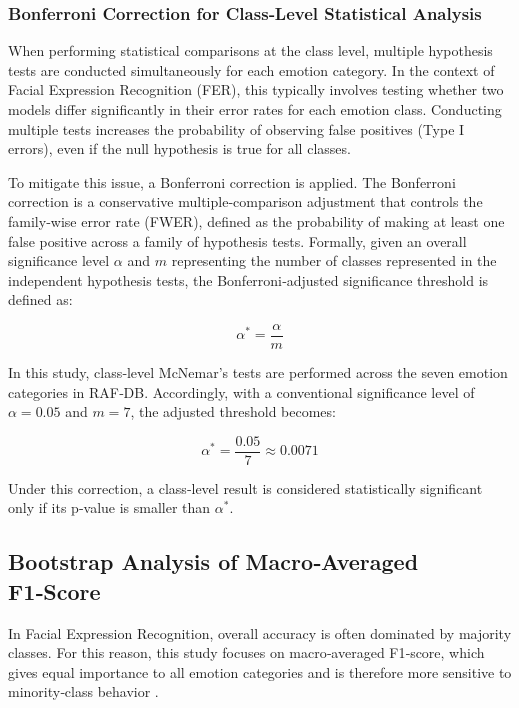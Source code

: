 \subsubsection{Bonferroni Correction for Class‑Level Statistical Analysis}\label{subsub:bonferroni_correction}

When performing statistical comparisons at the class level, multiple hypothesis tests are conducted simultaneously for each emotion category. In the context of Facial Expression Recognition (\gls{FER}), this typically involves testing whether two models differ significantly in their error rates for each emotion class. Conducting multiple tests increases the probability of observing false positives (Type I errors), even if the null hypothesis is true for all classes.

To mitigate this issue, a Bonferroni correction is applied. The Bonferroni correction is a conservative multiple‑comparison adjustment that controls the family‑wise error rate (FWER), defined as the probability of making at least one false positive across a family of hypothesis tests. Formally, given an overall significance level $\alpha$ and $m$ representing the number of classes represented in the independent hypothesis tests, the Bonferroni‑adjusted significance threshold is defined as:

$$\alpha^* = \frac{\alpha}{m}$$

In this study, class‑level McNemar’s tests are performed across the seven emotion categories in RAF‑DB. Accordingly, with a conventional significance level of $\alpha = 0.05 $ and $m=7$, the adjusted threshold becomes:

$$\alpha^* = \frac{0.05}{7} \approx 0.0071$$

Under this correction, a class‑level result is considered statistically significant only if its p‑value is smaller than $\alpha^*$.

\subsection{Bootstrap Analysis of Macro‑Averaged F1‑Score}

In Facial Expression Recognition, overall accuracy is often dominated by majority classes. For this reason, this study focuses on macro‑averaged F1‑score, which gives equal importance to all emotion categories and is therefore more sensitive to minority‑class behavior \cite{zhang_leave_2023}.


